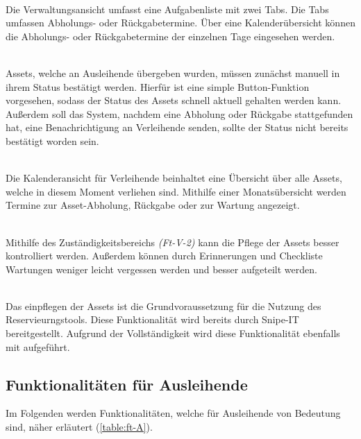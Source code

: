 {\sffamily\color{maincolor}{Ft-V-1 | Verwaltungsansicht }}\\
Die Verwaltungsansicht umfasst eine Aufgabenliste mit zwei Tabs. Die Tabs umfassen Abholungs- oder
Rückgabetermine. Über eine Kalenderübersicht können die Abholungs- oder Rückgabetermine der
einzelnen Tage eingesehen werden. 

    {\sffamily\color{maincolor}{Ft-V-2 | Bearbeiten des Assetstatus }}\\
Assets, welche an Ausleihende übergeben wurden, müssen zunächst manuell in ihrem
Status bestätigt werden. Hierfür ist eine simple Button-Funktion vorgesehen,
sodass der Status des Assets schnell aktuell gehalten werden kann. Außerdem soll
das System, nachdem eine Abholung oder Rückgabe stattgefunden hat, eine
Benachrichtigung an Verleihende senden, sollte der Status nicht bereits
bestätigt worden sein.

    {\sffamily\color{maincolor}{Ft-V-3 | Kalenderansicht für Verleihende}}\\
Die Kalenderansicht für Verleihende beinhaltet eine Übersicht über alle Assets,
welche in diesem Moment verliehen sind. Mithilfe einer Monatsübersicht werden
Termine zur Asset-Abholung, Rückgabe oder zur Wartung angezeigt.


    {\sffamily\color{maincolor}{Ft-V-4 | Pflege von Assets   }}\\
Mithilfe des Zuständigkeitsbereichs \textit{(Ft-V-2)} kann die Pflege der Assets
besser kontrolliert werden. Außerdem können durch Erinnerungen und Checkliste
Wartungen weniger leicht vergessen werden und besser aufgeteilt werden.

    {\sffamily\color{maincolor}{Ft-V-5 | Pflege der Datenbank }}\\
Das einpflegen der Assets ist die Grundvoraussetzung für die Nutzung des Reservieurngstools. Diese
Funktionalität wird bereits durch Snipe-IT bereitgestellt. Aufgrund der Vollständigkeit wird diese
Funktionalität ebenfalls mit aufgeführt.

\subsection{Funktionalitäten für Ausleihende}
Im Folgenden werden Funktionalitäten, welche für Ausleihende von Bedeutung sind,
näher erläutert (\ref{table:ft-A}).

